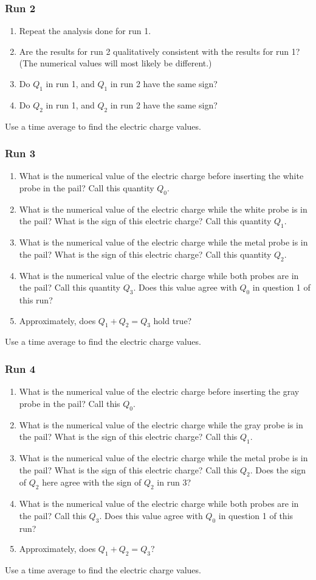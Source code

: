 \subsubsection{Run 2}
%
\begin{enumerate}
	\item Repeat the analysis done for run 1.
	\item Are the results for run 2 qualitatively consistent with the results for run 1? (The numerical values will most likely be different.)
	\item Do $Q_{1}$ in run 1, and $Q_{1}$ in run 2 have the same sign?
	\item Do $Q_{2}$ in run 1, and $Q_{2}$ in run 2 have the same sign?
\end{enumerate}
Use a time average to find the electric charge values.
%
\subsubsection{Run 3}
%
\begin{enumerate}
	\item What is the numerical value of the electric charge before inserting the white probe in the pail? Call this quantity $Q_{0}$.
	\item What is the numerical value of the electric charge while the white probe is in the pail? What is the sign of this electric charge? Call this quantity $Q_{1}$.
	\item What is the numerical value of the electric charge while the metal probe is in the pail? What is the sign of this electric charge? Call this quantity $Q_{2}$.
	\item What is the numerical value of the electric charge while both probes are in the pail? Call this quantity $Q_{3}$. Does this value agree with $Q_{0}$ in question 1 of this run?
	\item Approximately, does $Q_{1} + Q_{2} = Q_{3}$ hold true?
\end{enumerate}
Use a time average to find the electric charge values.
%
\subsubsection{Run 4}
%
\begin{enumerate}
	\item What is the numerical value of the electric charge before inserting the gray probe in the pail? Call this $Q_{0}$.
	\item What is the numerical value of the electric charge while the gray probe is in the pail? What is the sign of this electric charge? Call this $Q_{1}$.
	\item What is the numerical value of the electric charge while the metal probe is in the pail? What is the sign of this electric charge? Call this $Q_{2}$. Does the sign of $Q_{2}$ here agree with the sign of $Q_{2}$ in run 3?
	\item What is the numerical value of the electric charge while both probes are in the pail? Call this $Q_{3}$. Does this value agree with $Q_{0}$ in question 1 of this run?
	\item Approximately, does $Q_{1} + Q_{2} = Q_{3}$?
\end{enumerate}
Use a time average to find the electric charge values.
%
